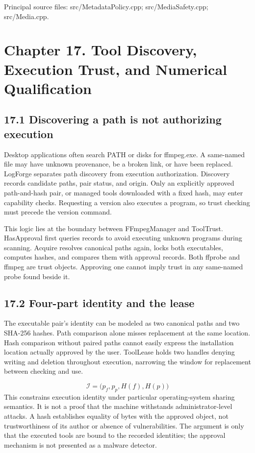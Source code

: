 \documentclass[11pt,a4paper,openany]{book}
\begin{document}
\par\small Principal source files: src/MetadataPolicy.cpp; src/MediaSafety.cpp; src/Media.cpp.\normalsize

\chapter*{Chapter 17. Tool Discovery, Execution Trust, and Numerical Qualification}

\section*{17.1 Discovering a path is not authorizing execution}
Desktop applications often search PATH or disks for ffmpeg.exe. A same-named file may have unknown provenance, be a broken link, or have been replaced. LogForge separates path discovery from execution authorization. Discovery records candidate paths, pair status, and origin. Only an explicitly approved path-and-hash pair, or managed tools downloaded with a fixed hash, may enter capability checks. Requesting a version also executes a program, so trust checking must precede the version command.

This logic lies at the boundary between FFmpegManager and ToolTrust. HasApproval first queries records to avoid executing unknown programs during scanning. Acquire resolves canonical paths again, locks both executables, computes hashes, and compares them with approval records. Both ffprobe and ffmpeg are trust objects. Approving one cannot imply trust in any same-named probe found beside it.


\section*{17.2 Four-part identity and the lease}
The executable pair's identity can be modeled as two canonical paths and two SHA-256 hashes. Path comparison alone misses replacement at the same location. Hash comparison without paired paths cannot easily express the installation location actually approved by the user. ToolLease holds two handles denying writing and deletion throughout execution, narrowing the window for replacement between checking and use.


\begin{equation}
\mathcal{I}=\bigl(p_f,p_p,H(f),H(p)\bigr)
\end{equation}
This constrains execution identity under particular operating-system sharing semantics. It is not a proof that the machine withstands administrator-level attacks. A hash establishes equality of bytes with the approved object, not trustworthiness of its author or absence of vulnerabilities. The argument is only that the executed tools are bound to the recorded identities; the approval mechanism is not presented as a malware detector.
\end{document}
